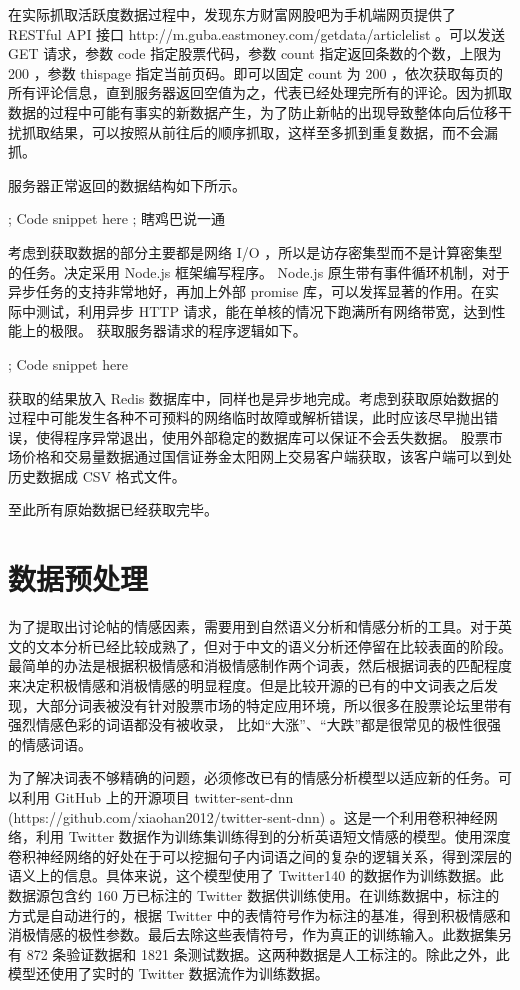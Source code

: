 在实际抓取活跃度数据过程中，发现东方财富网股吧为手机端网页提供了 RESTful API 接口 http://m.guba.eastmoney.com/getdata/articlelist 。可以发送 GET 请求，参数 code 指定股票代码，参数 count 指定返回条数的个数，上限为 200 ，参数 thispage 指定当前页码。即可以固定 count 为 200 ，依次获取每页的所有评论信息，直到服务器返回空值为之，代表已经处理完所有的评论。因为抓取数据的过程中可能有事实的新数据产生，为了防止新帖的出现导致整体向后位移干扰抓取结果，可以按照从前往后的顺序抓取，这样至多抓到重复数据，而不会漏抓。

服务器正常返回的数据结构如下所示。

; Code snippet here
; 瞎鸡巴说一通

考虑到获取数据的部分主要都是网络 I/O ，所以是访存密集型而不是计算密集型的任务。决定采用 Node.js 框架编写程序。 Node.js 原生带有事件循环机制，对于异步任务的支持非常地好，再加上外部 promise 库，可以发挥显著的作用。在实际中测试，利用异步 HTTP 请求，能在单核的情况下跑满所有网络带宽，达到性能上的极限。 获取服务器请求的程序逻辑如下。

; Code snippet here

获取的结果放入 Redis 数据库中，同样也是异步地完成。考虑到获取原始数据的过程中可能发生各种不可预料的网络临时故障或解析错误，此时应该尽早抛出错误，使得程序异常退出，使用外部稳定的数据库可以保证不会丢失数据。 股票市场价格和交易量数据通过国信证券金太阳网上交易客户端获取，该客户端可以到处历史数据成 CSV 格式文件。

至此所有原始数据已经获取完毕。

\section{数据预处理}

为了提取出讨论帖的情感因素，需要用到自然语义分析和情感分析的工具。对于英文的文本分析已经比较成熟了，但对于中文的语义分析还停留在比较表面的阶段。最简单的办法是根据积极情感和消极情感制作两个词表，然后根据词表的匹配程度来决定积极情感和消极情感的明显程度。但是比较开源的已有的中文词表之后发现，大部分词表被没有针对股票市场的特定应用环境，所以很多在股票论坛里带有强烈情感色彩的词语都没有被收录， 比如“大涨”、“大跌”都是很常见的极性很强的情感词语。

为了解决词表不够精确的问题，必须修改已有的情感分析模型以适应新的任务。可以利用 GitHub 上的开源项目 twitter-sent-dnn (https://github.com/xiaohan2012/twitter-sent-dnn) 。这是一个利用卷积神经网络，利用 Twitter 数据作为训练集训练得到的分析英语短文情感的模型。使用深度卷积神经网络的好处在于可以挖掘句子内词语之间的复杂的逻辑关系，得到深层的语义上的信息。具体来说，这个模型使用了 Twitter140 的数据作为训练数据。此数据源包含约 160 万已标注的 Twitter 数据供训练使用。在训练数据中，标注的方式是自动进行的，根据 Twitter 中的表情符号作为标注的基准，得到积极情感和消极情感的极性参数。最后去除这些表情符号，作为真正的训练输入。此数据集另有 872 条验证数据和 1821 条测试数据。这两种数据是人工标注的。除此之外，此模型还使用了实时的 Twitter 数据流作为训练数据。

